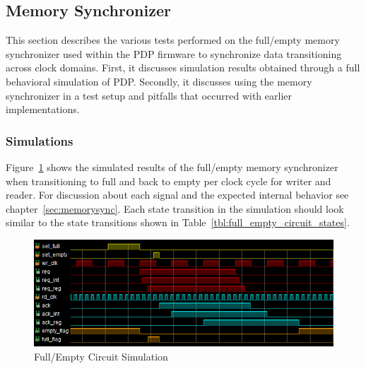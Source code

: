 
\label{chap:experimental_results}



\subsection{Memory Synchronizer}

This section describes the various tests performed on the full/empty memory synchronizer used within the PDP firmware to synchronize data transitioning across clock domains. First, it discusses simulation results obtained through a full behavioral simulation of PDP. Secondly, it discusses using the memory synchronizer in a test setup and pitfalls that occurred with earlier implementations.

\subsubsection{Simulations}
Figure~\ref{fig:full_empty_sim} shows the simulated results of the full/empty memory synchronizer when transitioning to full and back to empty per clock cycle for writer and reader. For discussion about each signal and the expected internal behavior see chapter~\ref{sec:memorysync}. Each state transition in the simulation should look similar to the state transitions shown in Table~\ref{tbl:full_empty_circuit_states}.

\begin{figure}
    \centering
    \includegraphics[width=1.0\textwidth]{fig/full_empty_sim.png}
    \caption{Full/Empty Circuit Simulation}
    \label{fig:full_empty_sim}
\end{figure}

